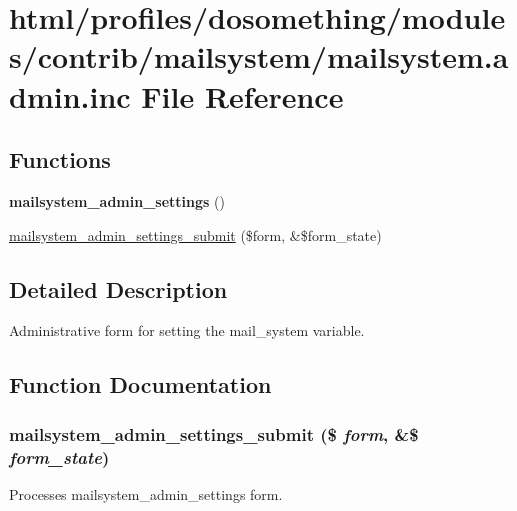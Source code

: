 \hypertarget{mailsystem_8admin_8inc}{
\section{html/profiles/dosomething/modules/contrib/mailsystem/mailsystem.admin.inc File Reference}
\label{mailsystem_8admin_8inc}
}
\subsection*{Functions}
\begin{DoxyCompactItemize}
\item 
\hypertarget{mailsystem_8admin_8inc_a28103cd29c4cfeaf3587d165abeb483a}{
{\bfseries mailsystem\_\-admin\_\-settings} ()}
\label{mailsystem_8admin_8inc_a28103cd29c4cfeaf3587d165abeb483a}

\item 
\hyperlink{mailsystem_8admin_8inc_ac6e0c3362eb43b6c1dd7e76c1d1564c3}{mailsystem\_\-admin\_\-settings\_\-submit} (\$form, \&\$form\_\-state)
\end{DoxyCompactItemize}


\subsection{Detailed Description}
Administrative form for setting the mail\_\-system variable. 

\subsection{Function Documentation}
\hypertarget{mailsystem_8admin_8inc_ac6e0c3362eb43b6c1dd7e76c1d1564c3}{
\subsubsection[{mailsystem\_\-admin\_\-settings\_\-submit}]{\setlength{\rightskip}{0pt plus 5cm}mailsystem\_\-admin\_\-settings\_\-submit (\$ {\em form}, \/  \&\$ {\em form\_\-state})}}
\label{mailsystem_8admin_8inc_ac6e0c3362eb43b6c1dd7e76c1d1564c3}
Processes mailsystem\_\-admin\_\-settings form. 